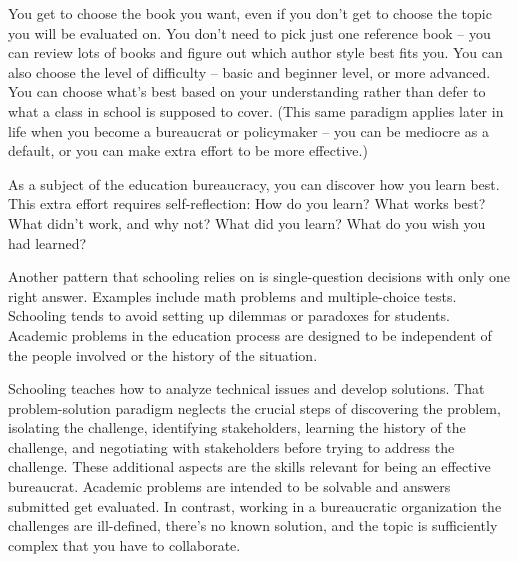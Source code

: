 You get to choose the book you want, even if you don't get to choose the topic you will be evaluated on. You don't  need to pick just one reference book -- you can review lots of books and figure out which author style best fits you. You can also choose the level of difficulty -- basic and beginner level, or more advanced. 
%
%
You can choose what's best based on your understanding rather than defer to what a class in school is supposed to cover. (This same paradigm applies later in life when you become a bureaucrat or policymaker -- you can be mediocre as a default, or you can make extra effort to be more effective.)

As a subject of the education bureaucracy, you can discover how you learn best. 
%
%
This extra effort requires self-reflection: How do you learn? What works best? What didn't work, and why not? What did you learn? What do you wish you had learned?

Another pattern that schooling relies on is single-question decisions with only one right answer. Examples include math problems and multiple-choice tests. Schooling tends to avoid setting up dilemmas or paradoxes for students. Academic problems in the education process are designed to be independent of the people involved or the history of the situation. 









Schooling teaches how to analyze technical issues and develop solutions. That problem-solution paradigm neglects the crucial steps of discovering the problem, isolating the challenge, identifying stakeholders, learning the history of the challenge, and negotiating with stakeholders before trying to address the challenge.  These additional aspects are the skills relevant for being an effective bureaucrat. Academic problems are intended to be solvable and answers submitted get evaluated. In contrast, working in a bureaucratic organization the challenges are ill-defined, there's no known solution, and the topic is sufficiently complex that you have to collaborate.

